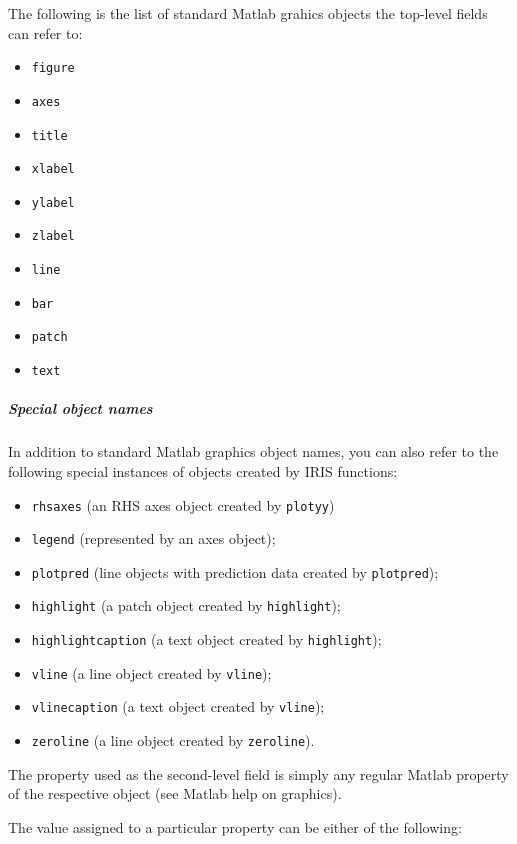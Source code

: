The following is the list of standard Matlab grahics objects the
top-level fields can refer to:

\begin{itemize}
\itemsep1pt\parskip0pt
\item
  \texttt{figure}
\item
  \texttt{axes}
\item
  \texttt{title}
\item
  \texttt{xlabel}
\item
  \texttt{ylabel}
\item
  \texttt{zlabel}
\item
  \texttt{line}
\item
  \texttt{bar}
\item
  \texttt{patch}
\item
  \texttt{text}
\end{itemize}

\subparagraph{Special object names}

In addition to standard Matlab graphics object names, you can also refer
to the following special instances of objects created by IRIS functions:

\begin{itemize}
\itemsep1pt\parskip0pt
\item
  \texttt{rhsaxes} (an RHS axes object created by \texttt{plotyy})
\item
  \texttt{legend} (represented by an axes object);
\item
  \texttt{plotpred} (line objects with prediction data created by
  \texttt{plotpred});
\item
  \texttt{highlight} (a patch object created by \texttt{highlight});
\item
  \texttt{highlightcaption} (a text object created by
  \texttt{highlight});
\item
  \texttt{vline} (a line object created by \texttt{vline});
\item
  \texttt{vlinecaption} (a text object created by \texttt{vline});
\item
  \texttt{zeroline} (a line object created by \texttt{zeroline}).
\end{itemize}

The property used as the second-level field is simply any regular Matlab
property of the respective object (see Matlab help on graphics).

The value assigned to a particular property can be either of the
following:

